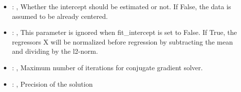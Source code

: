 \begin{itemize}
    \item {}: , 
      Whether the intercept should be estimated or not. If False,
      the data is assumed to be already centered.

    \item {}: , 
      This parameter is ignored when fit\_intercept is set to False. If True, the
      regressors X will be normalized before regression by subtracting the mean and dividing
      by the l2-norm.

    \item {}: , 
      Maximum number of iterations for conjugate gradient solver.

    \item {}: , 
      Precision of the solution


\end{itemize}
